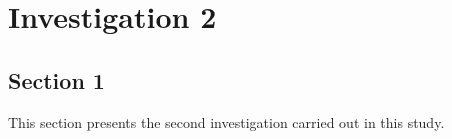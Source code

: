 \chapter{Investigation 2}
\label{chapter4}

\section{Section 1}
\begin{paragraph}
This section presents the second investigation carried out in this study.
\end{paragraph}